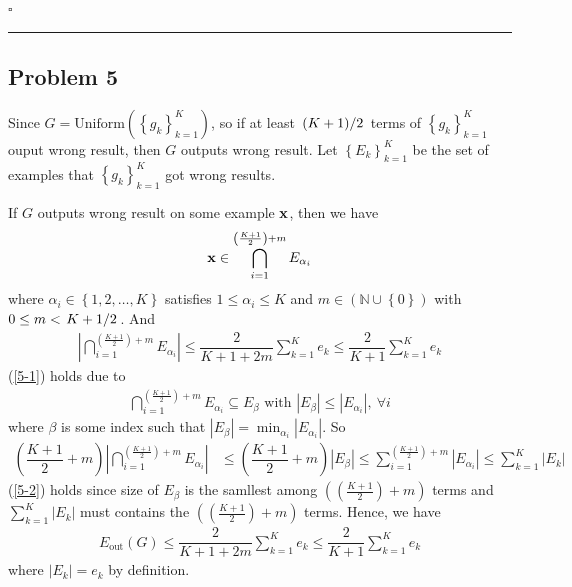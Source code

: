 \documentclass[12pt]{article}
\newcommand*{\QEDB}{\hfill\ensuremath{\square}}
\newcommand{\CBrackets}[1]{\left\{#1\right\}}
\newcommand{\ParTh}[1]{\left(#1\right)}
\newcommand{\BF}[1]{{\bf#1}}
\newcommand{\AbsVal}[1]{\left|#1\right|}
\newcommand{\Divide}[2]{\left.#1\middle/#2\right.}
\newcommand{\horrule}[1]{\rule{\linewidth}{#1}}
\begin{document}
\QEDB

\horrule{0.5pt}

\subsection*{Problem 5}

Since $G=\text{Uniform}\ParTh{\CBrackets{g_k}^K_{k=1}}$, so if at least $\Divide{\ParTh{K+1}}{2}$ terms of $\CBrackets{g_k}^K_{k=1}$ ouput wrong result, then $G$ outputs wrong result. Let $\CBrackets{E_k}^K_{k=1}$ be the set of examples that $\CBrackets{g_k}^K_{k=1}$ got wrong results.

If $G$ outputs wrong result on some example $\BF{x}$, then we have
\begin{align}
\BF{x}\in\bigcap^{\ParTh{\frac{{K+1}}{2}}+m}_{i=1}E_{\alpha_i}
\end{align}
where $\alpha_i\in\CBrackets{1,2,\ldots,K}$ satisfies $1\leq\alpha_i\leq K$ and $m\in\ParTh{\mathbb{N}\cup\CBrackets{0}}$ with $0\leq m<\Divide{{K+1}}{2}$. And
\begin{align}
\AbsVal{\bigcap^{\ParTh{\frac{{K+1}}{2}}+m}_{i=1}E_{\alpha_i}}\leq\dfrac{2}{K+1+2m}\sum_{k=1}^{K}e_k\leq\dfrac{2}{K+1}\sum_{k=1}^{K}e_k
\label{5-1}
\end{align}
(\ref{5-1}) holds due to %
\begin{align}
\bigcap^{\ParTh{\frac{{K+1}}{2}}+m}_{i=1}E_{\alpha_i}\subseteq E_{\beta}\text{ with }\AbsVal{E_\beta}\leq\AbsVal{E_{\alpha_i}},~\forall i
\end{align}
where $\beta$ is some index such that $\AbsVal{E_{\beta}}=\min_{\alpha_i}\AbsVal{E_{\alpha_i}}$. So
\begin{align}
\ParTh{\dfrac{K+1}{2}+m}\AbsVal{\bigcap^{\ParTh{\frac{{K+1}}{2}}+m}_{i=1}E_{\alpha_i}}&\leq\ParTh{\dfrac{K+1}{2}+m}\AbsVal{E_{\beta}}\leq\sum_{i=1}^{\ParTh{\frac{{K+1}}{2}}+m}\AbsVal{E_{\alpha_i}}\leq\sum_{k=1}^{K}\AbsVal{E_k}
\label{5-2}
\end{align}
(\ref{5-2}) holds since size of $E_\beta$ is the samllest among $\ParTh{\ParTh{\frac{{K+1}}{2}}+m}$ terms and $\sum_{k=1}^{K}\AbsVal{E_k}$ must contains the $\ParTh{\ParTh{\frac{{K+1}}{2}}+m}$ terms. Hence, we have
\begin{align}
E_{\text{out}}\ParTh{G}\leq\dfrac{2}{K+1+2m}\sum_{k=1}^{K}e_k\leq\dfrac{2}{K+1}\sum_{k=1}^{K}e_k
\end{align}
where $\AbsVal{E_k}=e_k$ by definition.

\end{document}
